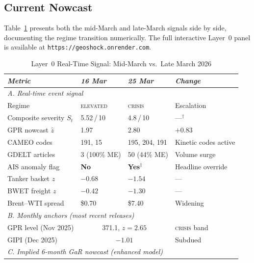\documentclass[12pt]{article}
\begin{document}
\subsection{Current Nowcast}

Table~\ref{tab:l0} presents both the mid-March and late-March signals
side by side, documenting the regime transition numerically.
The full interactive Layer~0 panel is available at
\texttt{https://geoshock.onrender.com}.


\begin{table}[htbp]
\caption{Layer~0 Real-Time Signal: Mid-March vs.\ Late March 2026}
\label{tab:l0}
\begin{center}
\begin{threeparttable}\small\setlength{\tabcolsep}{5pt}
\begin{tabular}{@{}p{4.0cm} p{3.0cm} p{3.0cm} p{3.5cm}@{}}
\toprule
\textit{Metric} & \textit{16 Mar} & \textit{25 Mar} & \textit{Change} \\
\midrule
\multicolumn{4}{l}{\textit{A. Real-time event signal}}\\[2pt]
Regime & \textsc{elevated} & \textsc{crisis} & Escalation\\
Composite severity $S_t$ & 5.52\,/\,10 & 4.8\,/\,10 & ---$^{\dagger}$\\
GPR nowcast $\hat{z}$ & 1.97 & 2.80 & $+0.83$\\
CAMEO codes & 191, 15 & 195, 204, 191 & Kinetic codes active\\
GDELT articles & 3 (100\% ME) & 50 (44\% ME) & Volume surge\\
AIS anomaly flag & \textbf{No} & \textbf{Yes}$^{\ddagger}$ & Headline override\\
Tanker basket $z$ & $-0.68$ & $-1.54$ & ---\\
BWET freight $z$ & $-0.42$ & $-1.30$ & ---\\
Brent--WTI spread & \$0.70 & \$7.40 & Widening\\
\midrule
\multicolumn{4}{l}{\textit{B. Monthly anchors (most recent releases)}}\\[2pt]
GPR level (Nov 2025) & \multicolumn{2}{c}{371.1, $z=2.65$} & \textsc{crisis} band\\
GIPI (Dec 2025) & \multicolumn{2}{c}{$-1.01$} & Subdued\\
\midrule
\multicolumn{4}{l}{\textit{C. Implied 6-month GaR nowcast (enhanced model)}}\\[2pt]

\end{tabular}
\end{threeparttable}
\end{center}
\end{table}
\end{document}

